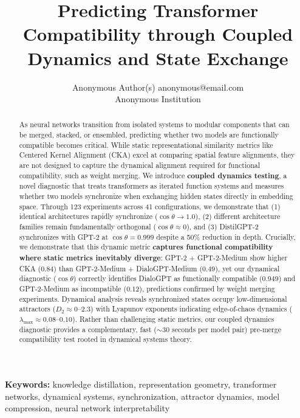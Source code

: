 \documentclass[10pt]{article} %
\title{Predicting Transformer Compatibility through Coupled Dynamics and State Exchange}
\author{\name Anonymous Author(s) \email anonymous@email.com \\
      \addr Anonymous Institution}
\theoremstyle{plain}
\theoremstyle{definition}
\theoremstyle{remark}
\begin{document}
\maketitle

\begin{abstract}
As neural networks transition from isolated systems to modular components that can be merged, stacked, or ensembled, predicting whether two models are functionally compatible becomes critical. While static representational similarity metrics like Centered Kernel Alignment (CKA) excel at comparing spatial feature alignments, they are not designed to capture the dynamical alignment required for functional compatibility, such as weight merging. We introduce \textbf{coupled dynamics testing}, a novel diagnostic that treats transformers as iterated function systems and measures whether two models synchronize when exchanging hidden states directly in embedding space. Through 123 experiments across 41 configurations, we demonstrate that (1) identical architectures rapidly synchronize ($\cos \theta \to 1.0$), (2) different architecture families remain fundamentally orthogonal ($\cos \theta \approx 0$), and (3) DistilGPT-2 synchronizes with GPT-2 at $\cos \theta = 0.999$ despite a 50\% reduction in depth. Crucially, we demonstrate that this dynamic metric \textbf{captures functional compatibility where static metrics inevitably diverge}: GPT-2 + GPT-2-Medium show higher CKA ($0.84$) than GPT-2-Medium + DialoGPT-Medium ($0.49$), yet our dynamical diagnostic ($\cos \theta$) correctly identifies DialoGPT as functionally compatible ($0.949$) and GPT-2-Medium as incompatible ($0.12$), predictions confirmed by weight merging experiments. Dynamical analysis reveals synchronized states occupy low-dimensional attractors ($D_2 \approx 0$--$2.3$) with Lyapunov exponents indicating edge-of-chaos dynamics ($\lambda_{\max} \approx 0.08$--$0.10$). Rather than challenging static metrics, our coupled dynamics diagnostic provides a complementary, fast ($\sim$30 seconds per model pair) pre-merge compatibility test rooted in dynamical systems theory.
\end{abstract}


\textbf{Keywords:} knowledge distillation, representation geometry, transformer networks, dynamical systems, synchronization, attractor dynamics, model compression, neural network interpretability
\end{document}

